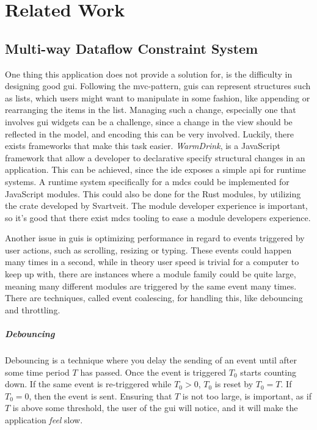\chapter{Related Work} \label{cha:related}

\section{Multi-way Dataflow Constraint System} \label{sec:mdcs}

One thing this application does not provide a solution for, is the difficulty
in designing good \gls{gui}. Following the \gls{mvc}-pattern, \gls{gui}s can
represent structures such as lists, which users might want to manipulate in
some fashion, like appending or rearranging the items in the list. Managing such
a change, especially one that involves \gls{gui} widgets can be a challenge,
since a change in the view should be reflected in the model, and encoding this
can be very involved. Luckily, there exists frameworks that make this task
easier. \textit{WarmDrink}, \cite{warmDrink, dslMdcs} is a JavaScript
framework that allow a developer to declarative specify structural changes in
an application. This can be achieved, since the \gls{ide} exposes a simple
\gls{api} for runtime systems. A runtime system specifically for a \gls{mdcs}
could be implemented for JavaScript modules. This could also be done for the
Rust modules, by utilizing the crate developed by Svartveit. \cite{mcdsRust}
The module developer experience is important, so it's good that there exist
\gls{mdcs} tooling to ease a module developers experience. \cite{toolMcds}

Another issue in \gls{gui}s is optimizing performance in regard to events
triggered by user actions, such as scrolling, resizing or typing. These events
could happen many times in a second, while in theory user speed is trivial for a
computer to keep up with, there are instances where a module family could be
quite large, meaning many different modules are triggered by the same event many
times. There are techniques, called event coalescing, for handling this, like
debouncing and throttling.

\paragraph{Debouncing} Debouncing is a technique where you delay the sending of
an event until after some time period $T$ has passed. Once the event is triggered
$T_0$ starts counting down. If the same event is re-triggered while $T_0 > 0$,
$T_0$ is reset by $T_0 = T$. If $T_0 = 0$, then the event is sent. Ensuring that
$T$ is not too large, is important, as if $T$ is above some threshold, the user
of the \gls{gui} will notice, and it will make the application \textit{feel}
slow.

